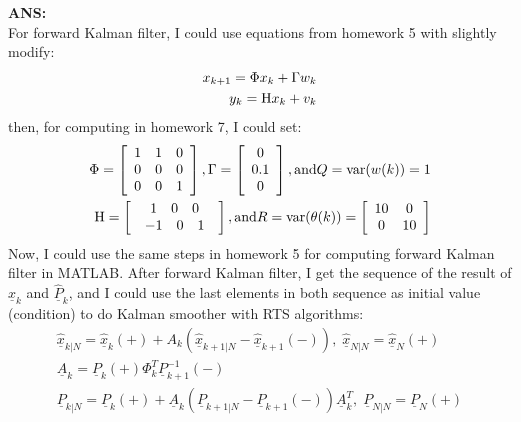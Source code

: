 \documentclass{article}
\begin{document}
\noindent \textbf{ANS:}\\
For forward Kalman filter, I could use equations from homework 5 with slightly modify:
\begin{eqnarray}
x_{k + 1}  = \Phi x_k  + \Gamma w_k \\
y_k  = {\rm H}x_k  + v_k 
\end{eqnarray}
then, for computing in homework 7, I could set:
\begin{eqnarray}
\Phi  = \left[ {\begin{array}{*{20}c}
   1 & 1 & 0  \\
   0 & 0 & 0  \\
   0 & 0 & 1  \\
\end{array}} \right],{\rm{ }}\Gamma  = \left[ {\begin{array}{*{20}c}
   0  \\
   {0.1}  \\
   0  \\
\end{array}} \right],{\rm{ and }}Q = {\mathop{\rm var}} (w(k)) = 1\\
{\rm H} = \left[ {\begin{array}{*{20}c}
   {\begin{array}{*{20}c}
   1 & 0 & 0  \\
\end{array}}  \\
   {\begin{array}{*{20}c}
   { - 1} & 0 & 1  \\
\end{array}}  \\
\end{array}} \right],{\rm{ and }}R = {\mathop{\rm var}} (\theta (k)) = \left[ {\begin{array}{*{20}c}
   {10} & 0  \\
   0 & {10}  \\
\end{array}} \right]
\end{eqnarray}
Now, I could use the same steps in homework 5 for computing forward Kalman filter in MATLAB.
After forward Kalman filter, I get the sequence of the result of $\underline{\hat{x}}_k$ and $\underline{\hat{P}}_k$, and 
I could use the last elements in both sequence as initial value (condition) to do Kalman smoother with RTS algorithms:
\begin{eqnarray}
\underline{\hat{x}}_{k\left| N \right.}  = \underline{\hat{x}}_k ( + ) + A_k (\underline{\hat{x}}_{k + 1\left| N \right.}  - \underline{\hat{x}}_{k + 1} ( - )), \; \underline{\hat{x}}_{N\left| N \right.}  = \underline{\hat{x}}_N ( + )\\
\underline{A}_k  = \underline{P}_k ( + )\Phi _k^T \underline{P}_{k + 1}^{ - 1} ( - )\\
\underline{P}_{k\left| N \right.}  = \underline{P}_k ( + ) + \underline{A}_k (\underline{P}_{k + 1\left| N \right.}  - \underline{P}_{k + 1} ( - ))\underline{A}_k^T , \;  \underline{P}_{N\left| N \right.}  = \underline{P}_N ( + )
\end{eqnarray} 
\end{document}
